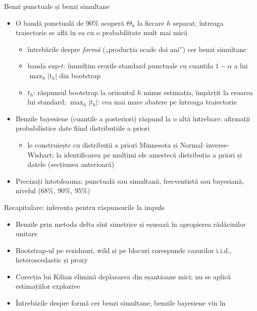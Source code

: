 \begin{frame}{Benzi punctuale și benzi simultane}
\itemsize{\small}
\begin{itemize}
    \item O bandă punctuală de 90\% acoperă $\Theta_h$ la fiecare $h$ separat; întreaga traiectorie se află în ea cu o probabilitate mult mai mică
    \begin{itemize}
        \item întrebările despre \emph{formă} („producția scade doi ani”) cer benzi simultane 
        \item banda sup-$t$: înmulțim erorile standard punctuale cu cuantila $1 - \alpha$ a lui $\max_h|t_h|$ din bootstrap
        \item $t_h$: răspunsul bootstrap la orizontul $h$ minus estimația, împărțit la eroarea lui standard; $\max_h|t_h|$: cea mai mare abatere pe întreaga traiectorie
    \end{itemize}
    \item Benzile bayesiene (cuantile a posteriori) răspund la o altă întrebare: afirmații probabilistice date fiind distribuțiile a priori
    \begin{itemize}
        \item {} le construiește cu distribuții a priori Minnesota și Normal--inverse-Wishart; la identificarea pe mulțimi ele amestecă distribuția a priori și datele (secțiunea anterioară)
    \end{itemize}
    \item Precizați întotdeauna: punctuală sau simultană, frecventistă sau bayesiană, nivelul (68\%, 90\%, 95\%)
\end{itemize}
\end{frame}

\begin{frame}{Recapitulare: inferența pentru răspunsurile la impuls}
\itemsize{\small}
\begin{itemize}
    \item Benzile prin metoda delta sînt simetrice și eșuează în apropierea rădăcinilor unitare
    \item Bootstrap-ul pe reziduuri, wild și pe blocuri corespunde cazurilor i.i.d., heteroscedastic și proxy
    \item Corecția lui Kilian elimină deplasarea din eșantioane mici; nu se aplică estimațiilor explozive
    \item Întrebările despre formă cer benzi simultane; benzile bayesiene vin în 
\end{itemize}
\end{frame}


